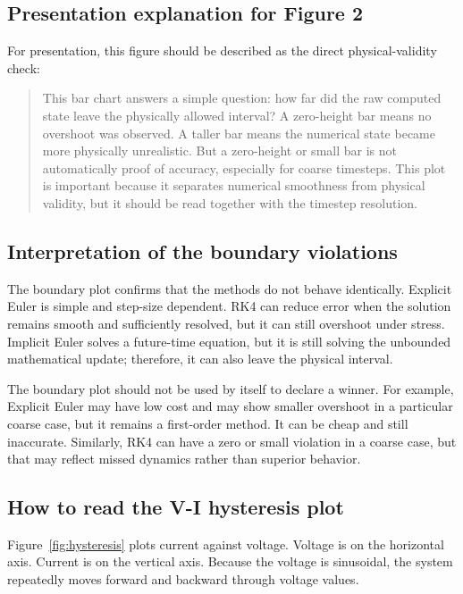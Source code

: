 \documentclass[11pt]{article}
\begin{document}
\subsection{Presentation explanation for Figure 2}

For presentation, this figure should be described as the direct physical-validity check:
\begin{quote}
This bar chart answers a simple question: how far did the raw computed state leave the physically allowed interval? A zero-height bar means no overshoot was observed. A taller bar means the numerical state became more physically unrealistic. But a zero-height or small bar is not automatically proof of accuracy, especially for coarse timesteps. This plot is important because it separates numerical smoothness from physical validity, but it should be read together with the timestep resolution.
\end{quote}

\subsection{Interpretation of the boundary violations}

The boundary plot confirms that the methods do not behave identically. Explicit Euler is simple and step-size dependent. RK4 can reduce error when the solution remains smooth and sufficiently resolved, but it can still overshoot under stress. Implicit Euler solves a future-time equation, but it is still solving the unbounded mathematical update; therefore, it can also leave the physical interval.

The boundary plot should not be used by itself to declare a winner. For example, Explicit Euler may have low cost and may show smaller overshoot in a particular coarse case, but it remains a first-order method. It can be cheap and still inaccurate. Similarly, RK4 can have a zero or small violation in a coarse case, but that may reflect missed dynamics rather than superior behavior.

\subsection{How to read the V-I hysteresis plot}

Figure~\ref{fig:hysteresis} plots current against voltage. Voltage is on the horizontal axis. Current is on the vertical axis. Because the voltage is sinusoidal, the system repeatedly moves forward and backward through voltage values.
\end{document}
